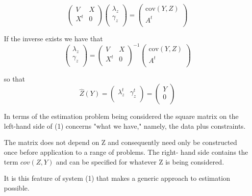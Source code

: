 \documentclass[12pt, a4paper]{article}
\begin{document}
\begin{equation}
\left(
  \begin{array}{cc}
    V & X \\
    X^t & 0 \\
  \end{array}
\right)\left(
  \begin{array}{c}
    \lambda_{z}\\
   \gamma_z \\
  \end{array}
\right)=\left(
  \begin{array}{c}
    \mbox{cov}(Y,Z)\\
   A^{t} \\
  \end{array}
\right)
\end{equation}


If the inverse exists we have that
\begin{equation}
\left(
  \begin{array}{c}
    \lambda_{z}\\
   \gamma_z \\
  \end{array}
\right)=\left(
  \begin{array}{cc}
    V & X \\
    X^t & 0 \\
  \end{array}
\right) ^{-1}\left(
  \begin{array}{c}
    \mbox{cov}(Y,Z)\\
   A^{t} \\
  \end{array}
\right)
\end{equation}



so that
\[ \hat{Z}(Y) =
\left(
  \begin{array}{cc}
    \lambda_{z}^{t}&
   \gamma_z^{t} \\
  \end{array}
\right)=\left(
  \begin{array}{c}
    Y \\
    0 \\
  \end{array}
\right) \]

In terms of the estimation problem being considered the square matrix on the left-hand side of (1) concerns "what we have," namely, the data plus constraints.

The matrix does not depend on Z and consequently need only be constructed once before application to a range of problems. The right- hand side contains the term $cov(Z,Y)$ and can be specified for whatever Z is being considered.

It is this feature of system (1) that makes a generic approach to estimation possible.



\newpage

\end{document}
